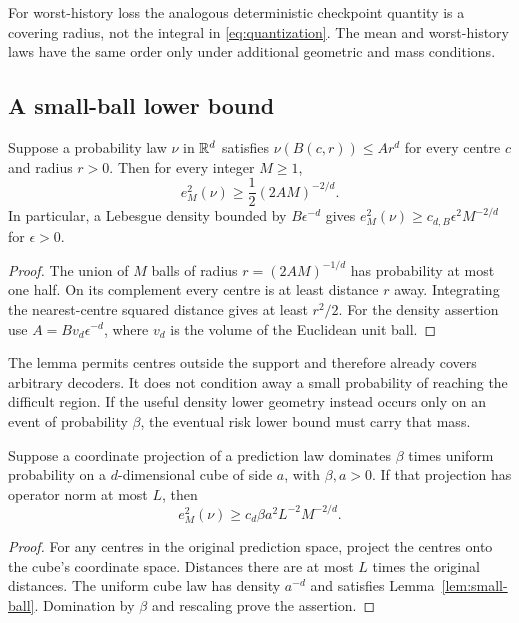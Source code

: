 For worst-history loss the analogous deterministic checkpoint quantity is
a covering radius, not the integral in \eqref{eq:quantization}. The mean
and worst-history laws have the same order only under additional geometric
and mass conditions.

\subsection{A small-ball lower bound}
\begin{lemma}\label{lem:small-ball}
Suppose a probability law $\nu$ in $\mathbb R^d$ satisfies
$\nu(B(c,r))\le A r^d$ for every centre $c$ and radius $r>0$.
Then for every integer $M\ge1$,
\begin{equation}\label{eq:small-ball}
 e_M^2(\nu)\ge\frac12(2AM)^{-2/d}.
\end{equation}
In particular, a Lebesgue density bounded by $B\epsilon^{-d}$ gives
$e_M^2(\nu)\ge c_{d,B}\epsilon^2M^{-2/d}$ for $\epsilon>0$.
\end{lemma}
\begin{proof}
The union of $M$ balls of radius $r=(2AM)^{-1/d}$ has probability at most
one half. On its complement every centre is at least distance $r$ away.
Integrating the nearest-centre squared distance gives at least $r^2/2$.
For the density assertion use $A=Bv_d\epsilon^{-d}$, where $v_d$ is the
volume of the Euclidean unit ball.
\end{proof}

The lemma permits centres outside the support and therefore already
covers arbitrary decoders. It does not condition away a small probability
of reaching the difficult region. If the useful density lower geometry
instead occurs only on an event of probability $\beta$, the eventual risk
lower bound must carry that mass.

\begin{lemma}\label{lem:attained-chart}
Suppose a coordinate projection of a prediction law dominates
$\beta$ times uniform probability on a $d$-dimensional cube of side $a$,
with $\beta,a>0$. If that projection has operator norm at most $L$, then
\[
 e_M^2(\nu)\ge c_d\beta a^2L^{-2}M^{-2/d}.
\]
\end{lemma}
\begin{proof}
For any centres in the original prediction space, project the centres onto
the cube's coordinate space. Distances there are at most $L$ times the
original distances. The uniform cube law has density $a^{-d}$ and
satisfies Lemma~\ref{lem:small-ball}. Domination by $\beta$ and rescaling
prove the assertion.
\end{proof}

